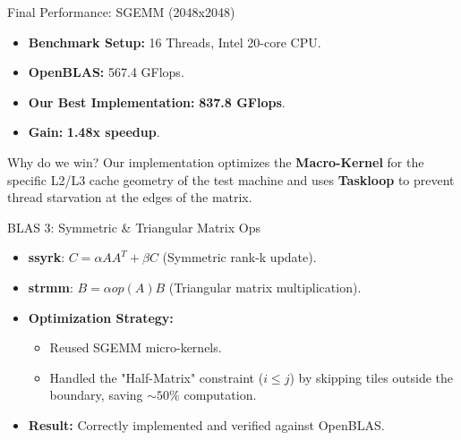 \documentclass[aspectratio=169]{beamer}
\begin{document}
\begin{frame}{Final Performance: SGEMM (2048x2048)}
  \begin{itemize}
    \item \textbf{Benchmark Setup:} 16 Threads, Intel 20-core CPU.
    \item \textbf{OpenBLAS:} 567.4 GFlops.
    \item \textbf{Our Best Implementation:} \textbf{837.8 GFlops}.
    \item \textbf{Gain:} \textbf{1.48x speedup}.
  \end{itemize}
  \begin{block}{Why do we win?}
    Our implementation optimizes the \textbf{Macro-Kernel} for the specific L2/L3 cache geometry of the test machine and uses \textbf{Taskloop} to prevent thread starvation at the edges of the matrix.
  \end{block}
\end{frame}

\begin{frame}{BLAS 3: Symmetric \& Triangular Matrix Ops}
  \begin{itemize}
    \item \textbf{ssyrk}: $C = \alpha AA^T + \beta C$ (Symmetric rank-k update).
    \item \textbf{strmm}: $B = \alpha op(A)B$ (Triangular matrix multiplication).
    \item \textbf{Optimization Strategy:}
      \begin{itemize}
        \item Reused SGEMM micro-kernels.
        \item Handled the "Half-Matrix" constraint ($i \le j$) by skipping tiles outside the boundary, saving $\sim 50\%$ computation.
      \end{itemize}
    \item \textbf{Result:} Correctly implemented and verified against OpenBLAS.
  \end{itemize}
\end{frame}
\end{document}
